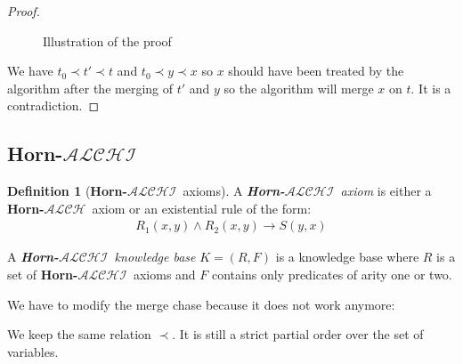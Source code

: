 \documentclass{article}
\theoremstyle{definition}
\newtheorem{definition}{Definition}[section]
\theoremstyle{remark}
\newcommand{\ALCH}{\textbf{Horn-$\mathcal{ALCH}$}}
\newcommand{\ALCHI}{\textbf{Horn-$\mathcal{ALCHI}$}}
\begin{document}
\begin{proof}
\begin{figure}
\begin{center}
\end{center}
\label{figure:proof}
\caption{Illustration of the proof}
\end{figure}

We have $t_0 \prec t' \prec t$ and $t_0 \prec y \prec x$ so $x$ should have been treated by the algorithm after the merging of $t'$ and $y$ so the algorithm will merge $x$ on $t$. It is a contradiction. 
\end{proof}


\subsection{\ALCHI}

\begin{definition}[\ALCHI\ axioms]
A \emph{\ALCHI\ axiom} is either a \ALCH\ axiom or an existential rule of the form:
\begin{align}
R_1(x,y) \wedge R_2(x,y) \rightarrow S(y,x)
\end{align}

A \emph{\ALCHI\ knowledge base} $K = (R,F)$ is a knowledge base where $R$ is a set of \ALCHI\ axioms and $F$ contains only predicates of arity one or two. 

\end{definition}

We have to modify the merge chase because it does not work anymore:

We keep the same relation $\prec$. It is still a strict partial order over the set of variables.





\end{document}
